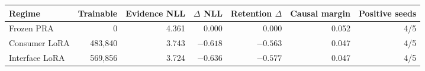 \begin{tabular}{lrrrrrr}
\toprule
Regime & Trainable & Evidence NLL & $\Delta$ NLL & Retention $\Delta$ & Causal margin & Positive seeds \\
\midrule
Frozen PRA & 0 & 4.361 & 0.000 & 0.000 & 0.052 & 4/5 \\
Consumer LoRA & 483,840 & 3.743 & $-0.618$ & $-0.563$ & 0.047 & 4/5 \\
Interface LoRA & 569,856 & 3.724 & $-0.636$ & $-0.577$ & 0.047 & 4/5 \\
\bottomrule
\end{tabular}
